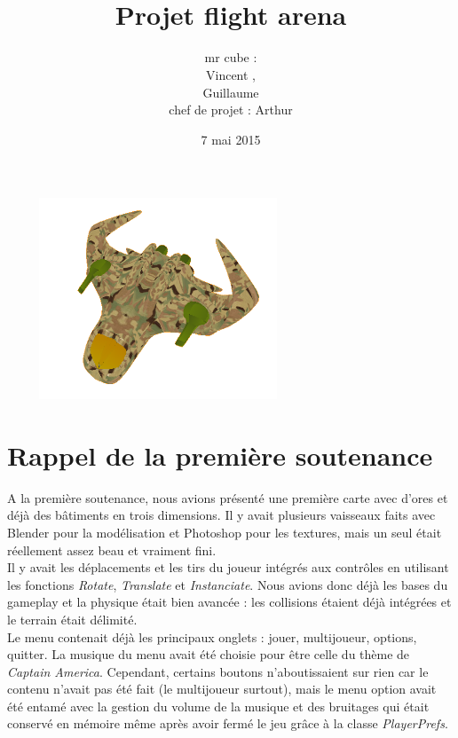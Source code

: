 \documentclass[10pt, titlepage]{report}
\title{\bsc{Rapport de la deuxième soutenance}\\Projet flight arena}
\author{mr cube :\\
Vincent \bsc{Rospini-Clerici},\\
Guillaume \bsc{Rebut}\\
chef de projet : Arthur \bsc{Remaud}}
\date{7 mai 2015}
\begin{document}
\maketitle
\renewcommand{\contentsname}{Sommaire}
\renewcommand{\chaptername}{Partie}

\tableofcontents

\begin{center}
\includegraphics[height=6cm, width=9cm]{vaisseaumilitaire.PNG}
\end{center}

\chapter{Rappel de la première soutenance}
A la première soutenance, nous avions présenté une première carte avec d’ores et déjà des bâtiments en trois dimensions. Il y avait plusieurs vaisseaux faits avec Blender pour la modélisation et Photoshop pour les textures, mais un seul était réellement assez beau et vraiment fini.\\

Il y avait les déplacements et les tirs du joueur intégrés aux contrôles en utilisant les fonctions \textit{Rotate}, \textit{Translate} et \textit{Instanciate}. Nous avions donc déjà les bases du gameplay et la physique était bien avancée : les collisions étaient déjà intégrées et le terrain était délimité.\\

Le menu contenait déjà les principaux onglets : jouer, multijoueur, options, quitter. La musique du menu avait été choisie pour être celle du thème de \textit{Captain America}. Cependant, certains boutons n'aboutissaient sur rien car le contenu n'avait pas été fait (le multijoueur surtout), mais le menu option avait été entamé avec la gestion du volume de la musique et des bruitages qui était conservé en mémoire même après avoir fermé le jeu grâce à la classe \textit{PlayerPrefs}.\\
\end{document}
